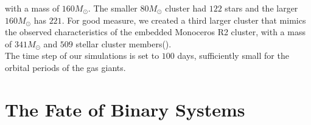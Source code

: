 \documentclass[manuscript]{aastex631}
\begin{document}
with a mass of $160 M_{\odot}$. The smaller $80M_{\odot}$ cluster had $122$ stars and the larger $160 M_{\odot}$ has $221$. For good measure, we created a third larger cluster
that mimics the observed characteristics of the embedded Monoceros R2 cluster, with a mass of $341 M_{\odot}$ and $509$ stellar cluster members(\cite{car97}). \\
The time step of our simulations is set to $100$ days, sufficiently small for the orbital periods of the gas giants. 
\section{The Fate of Binary Systems}
\end{document}
